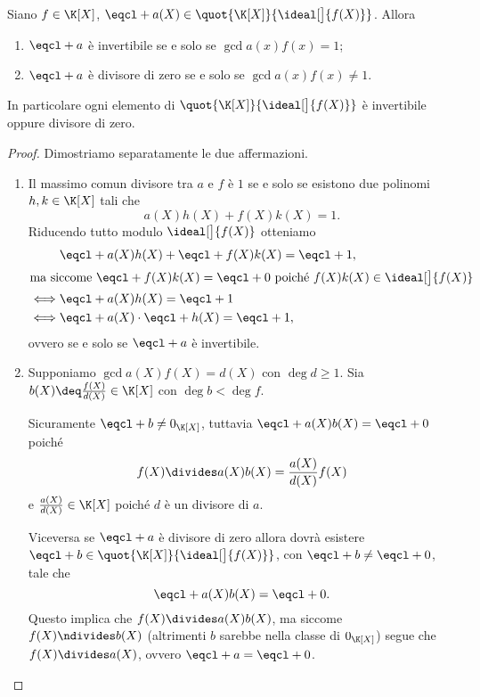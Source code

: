 \begin{proposition}
    \label{prop:invertibili_divzero_in_KX/f}
    Siano $f \in \K[X]$, $\eqcl+{a(X)} \in \quot{\K[X]}{\ideal[\big]{f(X)}}$.
    Allora \begin{enumerate}[label={(\roman*)}]
        \item $\eqcl+ a$ è invertibile se e solo se $\gcd{a(x)}{f(x)} = 1$;
        \item $\eqcl+ a$ è divisore di zero se e solo se $\gcd{a(x)}{f(x)} \neq 1$.
    \end{enumerate}
    In particolare ogni elemento di $\quot{\K[X]}{\ideal[\big]{f(X)}}$ è invertibile oppure divisore di zero.
\end{proposition}
\begin{proof}
    Dimostriamo separatamente le due affermazioni.
    \begin{enumerate}[label={(\roman*)}]
        \item Il massimo comun divisore tra $a$ e $f$ è $1$ se e solo se esistono due polinomi $h, k \in \K[X]$ tali che\[
            a(X)h(X) + f(X)k(X) = 1.    
        \] Riducendo tutto modulo $\ideal[\big]{f(X)}$ otteniamo \begin{align*}
            &\eqcl+{a(X)h(X)} + \eqcl+{f(X)k(X)} = \eqcl+ 1,\\
            \intertext{ma siccome $\eqcl+{f(X)k(X)} = \eqcl+ 0$ poiché $f(X)k(X) \in \ideal[\big]{f(X)}$}
            \iff &\eqcl+{a(X)h(X)} = \eqcl+ 1 \\
            \iff &\eqcl+{a(X)}\cdot\eqcl+{h(X)} = \eqcl+ 1,
        \end{align*} ovvero se e solo se $\eqcl+ a$ è invertibile.
        \item Supponiamo $\gcd{a(X)}{f(X)} = d(X)$ con $\deg d \geq 1$. Sia $b(X) \deq \frac{f(X)}{d(X)} \in \K[X]$ con $\deg b < \deg f$.
        
        Sicuramente $\eqcl+ b \neq 0_{\K[X]}$, tuttavia $\eqcl+{a(X)b(X)} = \eqcl+ 0$ poiché \[
            f(X) \divides a(X)b(X) = \frac{a(X)}{d(X)}f(X)
        \] e $\frac{a(X)}{d(X)} \in \K[X]$ poiché $d$ è un divisore di $a$.

        Viceversa se $\eqcl+ a$ è divisore di zero allora dovrà esistere $\eqcl+ b \in \quot{\K[X]}{\ideal[\big]{f(X)}}$, con $\eqcl+ b \neq \eqcl+ 0$, tale che \[
            \eqcl+{a(X)b(X)} = \eqcl+ 0.    
        \] Questo implica che $f(X) \divides a(X)b(X)$, ma siccome $f(X) \ndivides b(X)$ (altrimenti $b$ sarebbe nella classe di $0_{\K[X]}$) segue che $f(X) \divides a(X)$, ovvero $\eqcl+ a = \eqcl+ 0$.
    \end{enumerate}
\end{proof}

